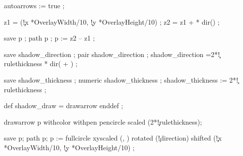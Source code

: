 \stopuseMPgraphic


  autoarrows := true ; %

  z1 = (\simpleslidesPictureParameter\c!x *OverlayWidth/10,
        \simpleslidesPictureParameter\c!y *OverlayHeight/10)   ;
  z2 = z1 +  *
            dir() ;

  save p ; path p ;
  p := z2 -- z1 ;

  \ifcase \simpleslidesShadow \else
  save shadow_direction ; pair shadow_direction ;
  shadow_direction =2*\simpleslidesPictureParameter\c!rulethickness * 
     dir( + 
     \ifcase \simpleslidesShadow {}    \fi ) ;

  save shadow_thickness ; numeric shadow_thickness ;
  shadow_thickness := 2*\simpleslidesPictureParameter\c!rulethickness ;

  def shadow_draw = drawarrow enddef ;

  \fi

  drawarrow p
       withcolor  
       withpen pencircle scaled (2*\simpleslidesPictureParameter\c!rulethickness);

\stopuseMPgraphic


  save p; path p;
  p := fullcircle xyscaled 
        (\simpleslidesCurrentXscale, \simpleslidesCurrentYscale)
       rotated (\simpleslidesPictureParameter\c!direction) 
       shifted
       (\simpleslidesPictureParameter\c!x *OverlayWidth/10,
        \simpleslidesPictureParameter\c!y *OverlayHeight/10)  ;

